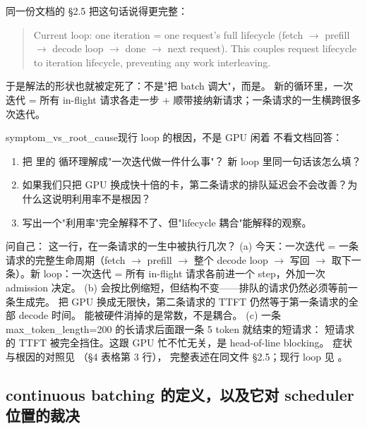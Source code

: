 同一份文档的 §2.5 把这句话说得更完整：

\begin{quote}
Current loop: one iteration = one request's full lifecycle (fetch $\to$ prefill $\to$ decode loop $\to$ done
$\to$ next request). This couples request lifecycle to iteration lifecycle, preventing any work interleaving.
\end{quote}

于是解法的形状也就被定死了：不是"把 batch 调大"，而是。
新的循环里，一次迭代 = 所有 in-flight 请求各走一步 + 顺带接纳新请求；一条请求的一生横跨很多次迭代。

\begin{checkpoint}{symptom_vs_root_cause}{现行 loop 的根因，不是 GPU 闲着}
不看文档回答：
\begin{enumerate}[label=(\alph*)]
  \item 把  里的  循环理解成"一次迭代做一件什么事"？
        新 loop 里同一句话该怎么填？
  \item 如果我们只把 GPU 换成快十倍的卡，第二条请求的排队延迟会不会改善？为什么这说明利用率不是根因？
  \item 写出一个"利用率"完全解释不了、但"lifecycle 耦合"能解释的观察。
\end{enumerate}
\hint 问自己： 这一行，在一条请求的一生中被执行几次？
\ifshowanswers
\tcblower
\answer (a) 今天：一次迭代 = 一条请求的完整生命周期（fetch $\to$ prefill $\to$ 整个 decode loop $\to$ 写回
$\to$ 取下一条）。新 loop：一次迭代 = 所有 in-flight 请求各前进一个 step，外加一次 admission 决定。
(b) 会按比例缩短，但结构不变——排队的请求仍然必须等前一条生成完。
把 GPU 换成无限快，第二条请求的 TTFT 仍然等于第一条请求的全部 decode 时间。
能被硬件消掉的是常数，不是耦合。
(c) 一条 max\_token\_length=200 的长请求后面跟一条 5 token 就结束的短请求：
短请求的 TTFT 被完全挡住。这跟 GPU 忙不忙无关，是 head-of-line blocking。
\whereincode 症状与根因的对照见 （§4 表格第 3 行），
完整表述在同文件 §2.5；现行 loop 见 。
\fi
\end{checkpoint}

\subsection{continuous batching 的定义，以及它对 scheduler 位置的裁决}
\label{sec:cb-def}

